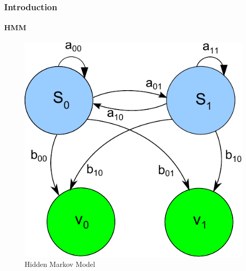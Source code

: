 \begin{frame}
\frametitle{Introduction}
\framesubtitle{HMM}
\logoCSIPCPL\mypagenum
	\begin{figure}				
		\includegraphics[width=.50\textwidth]{figs/HMM_flowDiagram.pdf}
		\caption{Hidden Markov Model}
	\end{figure}
\end{frame}




